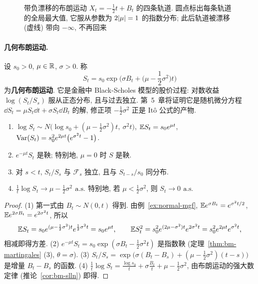 \begin{figure}[htbp]
\caption{带负漂移的布朗运动 $X_t=-\frac12t+B_t$ 的四条轨道. 圆点标出每条轨道的全局最大值, 它服从参数为 $2\lvert\mu\rvert=1$ 的指数分布; 此后轨道被漂移 (虚线) 带向 $-\infty$, 不再回来}
\label{fig:drift}
\end{figure}

\paragraph{几何布朗运动.} 设 $s_0>0$, $\mu\in\mathbb{R}$, $\sigma>0$. 称
\[
S_t=s_0\exp\Big(\sigma B_t+\big(\mu-\frac{1}{2}\sigma^2\big)t\Big)
\]
为\textbf{几何布朗运动}. 它是金融中 Black-Scholes 模型的股价过程: 对数收益 $\log(S_t/S_s)$ 服从正态分布, 且与过去独立. 第~5~章将证明它是随机微分方程 $\dd S_t=\mu S_t\dd t+\sigma S_t\dd B_t$ 的解, 修正项 $-\frac{1}{2}\sigma^2$ 正是 It\^o 公式的产物.

\begin{proposition}[几何布朗运动的性质]\label{prop:gbm}
\begin{enumerate}
\item $\log S_t\sim N\big(\log s_0+(\mu-\frac{1}{2}\sigma^2)t,\ \sigma^2t\big)$, $\mathbb{E} S_t=s_0e^{\mu t}$, $\operatorname{Var}(S_t)=s_0^2e^{2\mu t}\big(e^{\sigma^2t}-1\big)$.
\item $e^{-\mu t}S_t$ 是鞅; 特别地, $\mu=0$ 时 $S$ 是鞅.
\item 对 $s<t$, $S_t/S_s$ 与 $\mathcal{F}_s$ 独立, 且与 $S_{t-s}/s_0$ 同分布.
\item $\frac{1}{t}\log S_t\to\mu-\frac{1}{2}\sigma^2$ $\text{a.s.}$ 特别地, 若 $\mu<\frac{1}{2}\sigma^2$, 则 $S_t\to0$ $\text{a.s.}$
\end{enumerate}
\end{proposition}

\begin{proof}
(1) 第一式由 $B_t\sim N(0,t)$ 得到. 由例~\ref{ex:normal-mgf}, $\mathbb{E} e^{\sigma B_t}=e^{\sigma^2t/2}$, $\mathbb{E} e^{2\sigma B_t}=e^{2\sigma^2t}$, 所以
\[
\mathbb{E} S_t=s_0e^{(\mu-\frac{1}{2}\sigma^2)t}e^{\frac{1}{2}\sigma^2t}=s_0e^{\mu t},\qquad\mathbb{E} S_t^2=s_0^2e^{(2\mu-\sigma^2)t}e^{2\sigma^2t}=s_0^2e^{2\mu t}e^{\sigma^2t},
\]
相减即得方差. (2) $e^{-\mu t}S_t=s_0\exp(\sigma B_t-\frac{1}{2}\sigma^2t)$ 是指数鞅 (定理~\ref{thm:bm-martingales} (3), $\theta=\sigma$). (3) $S_t/S_s=\exp\big(\sigma(B_t-B_s)+(\mu-\frac{1}{2}\sigma^2)(t-s)\big)$ 是增量 $B_t-B_s$ 的函数. (4) $\frac{1}{t}\log S_t=\frac{\log s_0}{t}+\sigma\frac{B_t}{t}+\mu-\frac{1}{2}\sigma^2$, 由布朗运动的强大数定律 (推论~\ref{cor:bm-slln}) 即得.
\end{proof}

